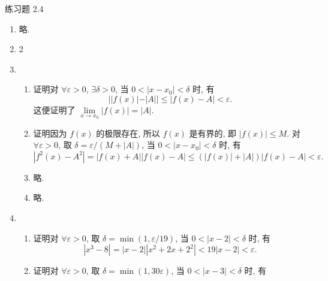 



% 


\begin{center}
    {\heiti 练习题 2.4}
\end{center}

\begin{enumerate}
    \item %
        略.
    \item 2
    \item %
        \begin{enumerate}[(1)]
            \item %
                {\heiti 证明}\quad 对 $\forall \varepsilon > 0$, $\exists \delta > 0$, 当 $0 < |x - x_0| < \delta$ 时, 有
                \[
                    ||f(x)| - |A|| \leqslant |f(x) - A| < \varepsilon.    
                \]
                这便证明了 $\lim\limits_{x\to x_0}|f(x)| = |A|$.
            \item %
                {\heiti 证明}\quad 因为 $f(x)$ 的极限存在, 所以 $f(x)$ 是有界的, 即 $|f(x)| \leqslant M$.
                对 $\forall \varepsilon > 0$, 取 $\delta = \varepsilon/(M + |A|)$, 当 $0 < |x - x_0| < \delta$ 时, 有
                \[
                    |f^2(x) - A^2| = |f(x) + A||f(x) - A| \leqslant (|f(x)| + |A|)|f(x) - A| < \varepsilon.
                \]
            \item %
                略.
            \item %
                略.
        \end{enumerate}
    \item %
        \begin{enumerate}[(1)]
            \item %
                {\heiti 证明}\quad 对 $\forall \varepsilon > 0$, 取 $\delta = \min(1, \varepsilon/19)$, 当 $0 < |x - 2| < \delta$ 时, 有
                \[
                    |x^3 - 8| = |x - 2||x^2 + 2x + 2^2| < 19|x - 2| < \varepsilon.   
                \]
            \item %
                {\heiti 证明}\quad 对 $\forall \varepsilon > 0$, 取 $\delta = \min(1, 30\varepsilon)$, 当 $0 < |x - 3| < \delta$ 时, 有

\end{enumerate}
\end{enumerate}
